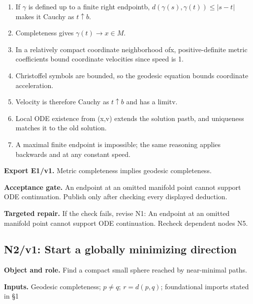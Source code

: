 \documentclass[preprint,12pt,aps,pra,showkeys,amsmath,amssymb,superscriptaddress,floatfix]{revtex4-2}
\theoremstyle{definition}
\theoremstyle{remark}
\newcommand{\field}[2]{\par\smallskip\noindent\textbf{#1.} #2\par}
\begin{document}
\begin{enumerate}[label=N1.\arabic*,leftmargin=3.4em]

\item If \(\gamma\) is defined up to a finite right endpointb,
\(d(\gamma (s),\gamma (t))\le |s-t|\) makes it Cauchy as
\(t\uparrow b\).

\item Completeness gives \(\gamma (t)\to x\in M\).

\item In a relatively compact coordinate neighborhood ofx, positive-definite
metric coefficients bound coordinate velocities since speed is 1.

\item Christoffel symbols are bounded, so the geodesic equation bounds
coordinate acceleration.

\item Velocity is therefore Cauchy as \(t\uparrow b\) and has a limitv.

\item Local ODE existence from (x,v) extends the solution pastb, and
uniqueness matches it to the old solution.

\item A maximal finite endpoint is impossible; the same reasoning applies
backwards and at any constant speed.

\end{enumerate}

\field{Export E1/v1}{Metric completeness implies geodesic completeness.}

\field{Acceptance gate}{An endpoint at an omitted manifold point cannot support ODE
continuation. Publish only after checking every displayed deduction.}

\field{Targeted repair}{If the check fails, revise N1: An endpoint at an omitted manifold point
cannot support ODE continuation. Recheck dependent nodes N5.}

\clearpage

\subsection{N2/v1: Start a globally minimizing direction}

\field{Object and role}{Find a compact small sphere reached by near-minimal paths.}

\field{Inputs}{Geodesic completeness; \(p\ne q\); \(r=d(p,q)\); foundational imports
stated in §1}
\end{document}
